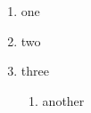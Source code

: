 
\begin{enumerate}
  \item one
  \item two
  \item three

  \begin{enumerate}
    \item another
  \end{enumerate}
\end{enumerate}


